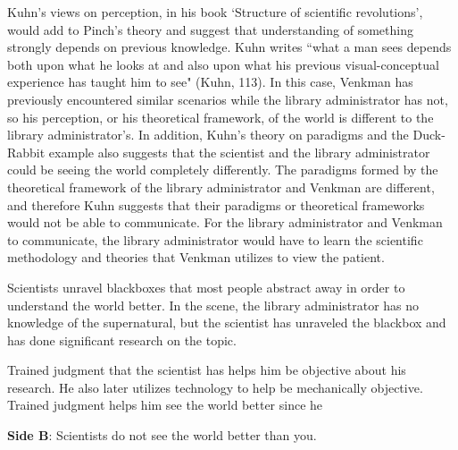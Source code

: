 \documentclass[11pt, oneside]{article}
\begin{document}
\par Kuhn's views on perception, in his book `Structure of scientific revolutions', would add to Pinch's theory and suggest that understanding of something strongly depends on previous knowledge. Kuhn writes ``what a man sees depends both upon what he looks at and also upon what his previous visual-conceptual experience has taught him to see" (Kuhn, 113). In this case, Venkman has previously encountered similar scenarios while the library administrator has not, so his perception, or his theoretical framework, of the world is different to the library administrator's. In addition, Kuhn's theory on paradigms and the Duck-Rabbit example also suggests that the scientist and the library administrator could be seeing the world completely differently. The paradigms formed by the theoretical framework of the library administrator and Venkman are different, and therefore Kuhn suggests that their paradigms or theoretical frameworks would not be able to communicate. For the library administrator and Venkman to communicate, the library administrator would have to learn the scientific methodology and theories that Venkman utilizes to view the patient.



\par Scientists unravel blackboxes that most people abstract away in order to understand the world better. In the scene, the library administrator has no knowledge of the supernatural, but the scientist has unraveled the blackbox and has done significant research on the topic.


\par Trained judgment that the scientist has helps him be objective about his research. He also later utilizes technology to help be mechanically objective. Trained judgment helps him see the world better since he 

\newpage

\noindent \textbf{Side B}: Scientists do not see the world better than you.
\end{document}
